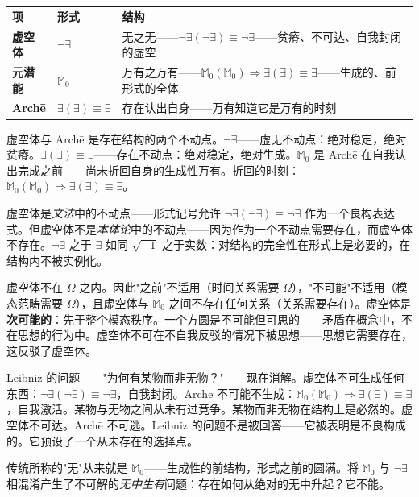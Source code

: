 \documentclass[10pt, openany, oneside]{book}
\renewcommand{\footnotesize}{\fontsize{8.5}{11}\selectfont}
\begin{document}
{\footnotesize
\noindent\begin{tabular}{l l p{}}
\textbf{项} & \textbf{形式} & \textbf{结构} \\[0.4em]
\textbf{虚空体} & $\neg\exists$ & 无之无——$\neg\exists(\neg\exists) \equiv \neg\exists$——贫瘠、不可达、自我封闭的虚空 \\[0.3em]
\textbf{元潜能} & $\mathbb{M}_0$ & 万有之万有——$\mathbb{M}_0(\mathbb{M}_0) \Rightarrow \exists(\exists) \equiv \exists$——生成的、前形式的全体 \\[0.3em]
\textbf{Arch\={e}} & $\exists(\exists) \equiv \exists$ & 存在认出自身——万有知道它是万有的时刻 \\[0.3em]
\end{tabular}
}

\vspace{0.5em}

\noindent 虚空体与 Arch\={e} 是存在结构的两个不动点。$\neg\exists$——虚无不动点：绝对稳定，绝对贫瘠。$\exists(\exists) \equiv \exists$——存在不动点：绝对稳定，绝对生成。$\mathbb{M}_0$ 是 Arch\={e} 在自我认出完成之前——尚未折回自身的生成性万有。折回的时刻：$\mathbb{M}_0(\mathbb{M}_0) \Rightarrow \exists(\exists) \equiv \exists$。

虚空体是\textit{文法}中的不动点——形式记号允许 $\neg\exists(\neg\exists) \equiv \neg\exists$ 作为一个良构表达式。但虚空体不是\textit{本体论}中的不动点——因为作为一个不动点需要存在，而虚空体不存在。$\neg\exists$ 之于 $\exists$ 如同 $\sqrt{-1}$ 之于实数：对结构的完全性在形式上是必要的，在结构内不被实例化。

虚空体不在 $\Omega$ 之内。因此"之前"不适用（时间关系需要 $\Omega$），"不可能"不适用（模态范畴需要 $\Omega$），且虚空体与 $\mathbb{M}_0$ 之间不存在任何关系（关系需要存在）。虚空体是\textbf{次可能的}：先于整个模态秩序。一个方圆是不可能但可思的——矛盾在概念中，不在思想的行为中。虚空体不可在不自我反驳的情况下被思想——思想它需要存在，这反驳了虚空体。

Leibniz 的问题——"为何有某物而非无物？"——现在消解。虚空体不可生成任何东西：$\neg\exists(\neg\exists) \equiv \neg\exists$，自我封闭。Arch\={e} 不可能不生成：$\mathbb{M}_0(\mathbb{M}_0) \Rightarrow \exists(\exists) \equiv \exists$，自我激活。某物与无物之间从未有过竞争。某物而非无物在结构上是必然的。虚空体不可达。Arch\={e} 不可逃。Leibniz 的问题不是被回答——它被表明是不良构成的。它预设了一个从未存在的选择点。

传统所称的"无"从来就是 $\mathbb{M}_0$——生成性的前结构，形式之前的圆满。将 $\mathbb{M}_0$ 与 $\neg\exists$ 相混淆产生了不可解的\textit{无中生有}问题：存在如何从绝对的无中升起？它不能。
\end{document}
